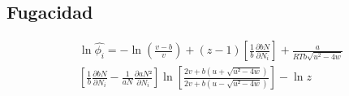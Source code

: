 \subsection{Fugacidad}\label{subsec:fugacity}

\begin{multline}
\ln\hat{\phi_i} = - \ln\left(\frac{v-b}{v}\right) 
+ (z-1)\left[\frac{1}{b}\frac{\partial bN}{\partial N_i}\right]
+ \frac{a}{RTb\sqrt{u^2-4w}}
\\
\left[\frac{1}{b}\frac{\partial bN}{\partial N_i}
- \frac{1}{aN}\frac{\partial aN²}{\partial N_i}\right]
\ln\left[\frac{2v+b\left(u + \sqrt{u²-4w}\right)}{2v+b\left(u - \sqrt{u²-4w}\right)}\right]
-\ln{z}
\end{multline}